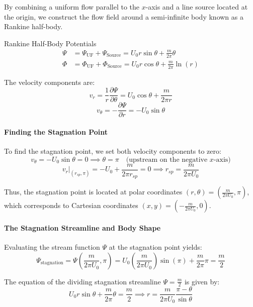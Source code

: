 By combining a uniform flow parallel to the $x$-axis and a line source located at the origin, we construct the flow field around a semi-infinite body known as a Rankine half-body.

\begin{eqbox}{Rankine Half-Body Potentials}
\begin{align*}
\Psi &= \Psi_{\text{UF}} + \Psi_{\text{Source}} = U_0 r \sin\theta + \frac{m}{2\pi}\theta \\
\Phi &= \Phi_{\text{UF}} + \Phi_{\text{Source}} = U_0 r \cos\theta + \frac{m}{2\pi}\ln(r)
\end{align*}
\end{eqbox}

The velocity components are:
$$v_r = \frac{1}{r}\frac{\partial \Psi}{\partial \theta} = U_0 \cos\theta + \frac{m}{2\pi r}$$
$$v_\theta = -\frac{\partial \Psi}{\partial r} = -U_0 \sin\theta$$

\paragraph{Finding the Stagnation Point}
To find the stagnation point, we set both velocity components to zero:
$$v_\theta = -U_0 \sin\theta = 0 \implies \theta = \pi \quad \text{(upstream on the negative } x\text{-axis)}$$
$$v_r\big|_{(r_{sp}, \pi)} = -U_0 + \frac{m}{2\pi r_{sp}} = 0 \implies r_{sp} = \frac{m}{2\pi U_0}$$

Thus, the stagnation point is located at polar coordinates $(r, \theta) = \left( \frac{m}{2\pi U_0}, \pi \right)$, which corresponds to Cartesian coordinates $(x, y) = \left(-\frac{m}{2\pi U_0}, 0 \right)$.

\paragraph{The Stagnation Streamline and Body Shape}
Evaluating the stream function $\Psi$ at the stagnation point yields:
$$\Psi_{\text{stagnation}} = \Psi\left(\frac{m}{2\pi U_0}, \pi\right) = U_0 \left(\frac{m}{2\pi U_0}\right) \sin(\pi) + \frac{m}{2\pi}\pi = \frac{m}{2}$$

The equation of the dividing stagnation streamline $\Psi = \frac{m}{2}$ is given by:
$$U_0 r \sin\theta + \frac{m}{2\pi}\theta = \frac{m}{2} \implies r = \frac{m}{2\pi U_0} \frac{\pi - \theta}{\sin\theta}$$

